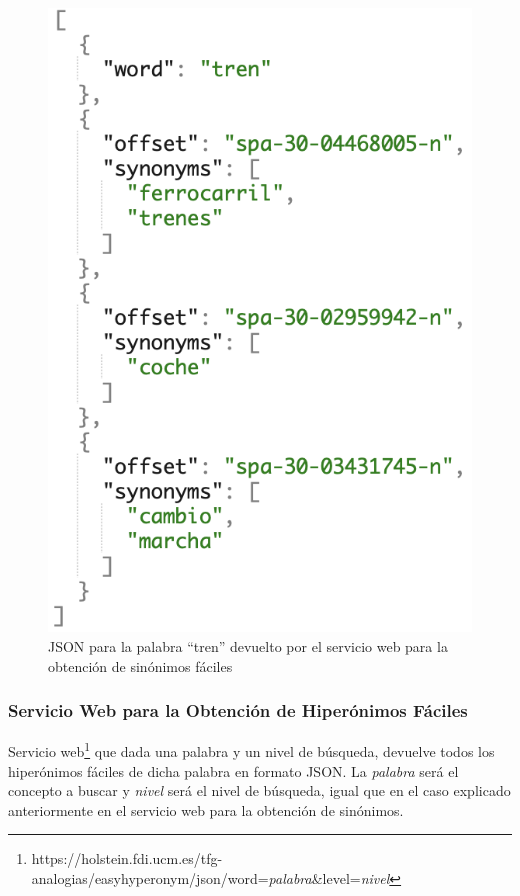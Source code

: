 \begin{figure}[!h]
	\includegraphics[width=.4\textwidth]{Imagenes/Bitmap/Capitulo4/JSON-SW/peticionGetEasySynonym.png}
	\centering
	\caption{JSON  para la palabra ``tren'' devuelto por el servicio web para la obtención de sinónimos fáciles}
	\label{fig:peticionGetEasySynonym}
\end{figure}


\subsubsection{Servicio Web para la Obtención de Hiperónimos Fáciles}
\label{cap:subsec:sw_hiperonimosfaciles}
Servicio web\footnote{https://holstein.fdi.ucm.es/tfg-analogias/easyhyperonym/json/word=\textit{palabra}\&level=\textit{nivel}} que dada una palabra y un nivel de búsqueda, devuelve todos los hiperónimos fáciles de dicha palabra en formato JSON. La \textit{palabra} será el concepto a buscar y \textit{nivel} será el nivel de búsqueda, igual que en el caso explicado anteriormente en el servicio web para la obtención de sinónimos.

